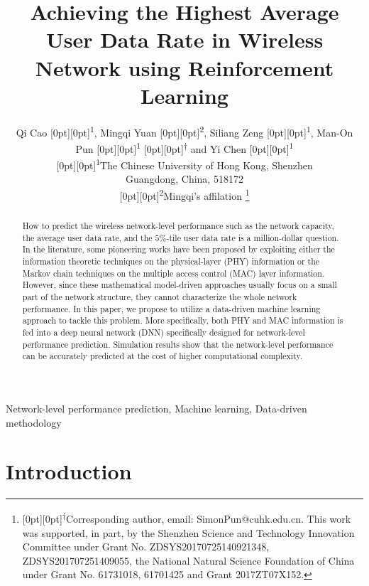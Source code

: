 \documentclass[conference,compsocconf]{IEEEtran}
\DeclareRobustCommand*{\IEEEauthorrefmark}[1]{%
	\raisebox{0pt}[0pt][0pt]{\textsuperscript{\footnotesize\ensuremath{#1}}}}
\begin{document}
	\title{Achieving the Highest Average User Data Rate in Wireless Network using Reinforcement Learning}
	\author{Qi Cao\IEEEauthorrefmark{1}, Mingqi Yuan\IEEEauthorrefmark{2}, Siliang Zeng\IEEEauthorrefmark{1}, Man-On Pun\IEEEauthorrefmark{1}\IEEEauthorrefmark{\dagger} and Yi Chen\IEEEauthorrefmark{1}\\
	\IEEEauthorrefmark{1}The Chinese University of Hong Kong, Shenzhen\\
	Guangdong, China, 518172\\
	\IEEEauthorrefmark{2}Mingqi's affilation
	\thanks{\IEEEauthorrefmark{\dagger}Corresponding author, email: SimonPun@cuhk.edu.cn. This work was supported, in part, by the Shenzhen Science and Technology Innovation Committee under Grant No. ZDSYS20170725140921348, ZDSYS201707251409055, the National Natural Science Foundation of China under Grant No. 61731018, 61701425 and Grant 2017ZT07X152.}}
\maketitle
	
	\begin{abstract}
		How to predict the wireless network-level performance such as the network capacity, the average user data rate, and the $5\%$-tile user data rate is a million-dollar question. In the literature, some pioneering works have been proposed by exploiting either the information theoretic techniques on the physical-layer (PHY) information or the Markov chain techniques on the multiple access control (MAC) layer information. However, since these mathematical model-driven approaches usually focus on a small part of the network structure, they cannot characterize the whole network performance. In this paper, we propose to utilize a data-driven machine learning approach to tackle this problem. More specifically, both PHY and MAC information is fed into a deep neural network (DNN) specifically designed for network-level performance prediction. Simulation results show that the network-level performance can be accurately predicted at the cost of higher computational complexity.
	\end{abstract}
	
	\begin{IEEEkeywords}
		Network-level performance prediction, Machine learning, Data-driven methodology
	\end{IEEEkeywords}
	
	\section{Introduction}
	
\end{document}
